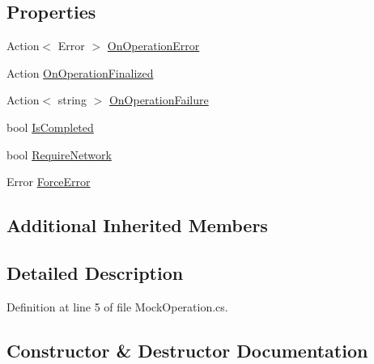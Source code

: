 \subsection*{Properties}
\begin{DoxyCompactItemize}
\item 
Action$<$ Error $>$ \mbox{\hyperlink{class_unity_editor_1_1_package_manager_1_1_u_i_1_1_tests_1_1_mock_operation_a943d20308cda1acecdff657c48deb668}{On\+Operation\+Error}}
\item 
Action \mbox{\hyperlink{class_unity_editor_1_1_package_manager_1_1_u_i_1_1_tests_1_1_mock_operation_af503f49be73f10affc86658cde2cc94c}{On\+Operation\+Finalized}}
\item 
Action$<$ string $>$ \mbox{\hyperlink{class_unity_editor_1_1_package_manager_1_1_u_i_1_1_tests_1_1_mock_operation_a9aab252c1a0a7319315d8cf523819903}{On\+Operation\+Failure}}
\item 
bool \mbox{\hyperlink{class_unity_editor_1_1_package_manager_1_1_u_i_1_1_tests_1_1_mock_operation_a9602c2b82e8315eada49ac24c117ec84}{Is\+Completed}}
\item 
bool \mbox{\hyperlink{class_unity_editor_1_1_package_manager_1_1_u_i_1_1_tests_1_1_mock_operation_ae03c99af48f81df0393929d733098bca}{Require\+Network}}
\item 
Error \mbox{\hyperlink{class_unity_editor_1_1_package_manager_1_1_u_i_1_1_tests_1_1_mock_operation_a3796db44c589af7e5fdb784c49b5d99d}{Force\+Error}}
\end{DoxyCompactItemize}
\subsection*{Additional Inherited Members}


\subsection{Detailed Description}


Definition at line 5 of file Mock\+Operation.\+cs.



\subsection{Constructor \& Destructor Documentation}
\mbox{\label{class_unity_editor_1_1_package_manager_1_1_u_i_1_1_tests_1_1_mock_operation_a9cabeb25fa9d36f75e59012f142583dd}} 
